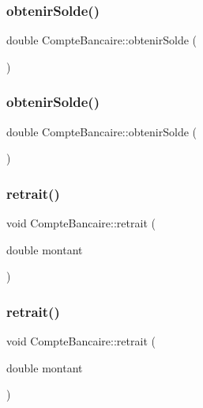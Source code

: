 \subsubsection{\texorpdfstring{obtenir\+Solde()}{obtenirSolde()}\hspace{0.1cm}{\footnotesize\ttfamily [1/2]}}
{\footnotesize\ttfamily double Compte\+Bancaire\+::obtenir\+Solde (\begin{DoxyParamCaption}{ }\end{DoxyParamCaption})}

\mbox{\label{classCompteBancaire_a6ed81e6f30e6d8d31f5c3ffe7f9755c4}} 
\subsubsection{\texorpdfstring{obtenir\+Solde()}{obtenirSolde()}\hspace{0.1cm}{\footnotesize\ttfamily [2/2]}}
{\footnotesize\ttfamily double Compte\+Bancaire\+::obtenir\+Solde (\begin{DoxyParamCaption}{ }\end{DoxyParamCaption})}

\mbox{\label{classCompteBancaire_ad25cfbad3651fd3a920b21a2d670826c}} 
\subsubsection{\texorpdfstring{retrait()}{retrait()}\hspace{0.1cm}{\footnotesize\ttfamily [1/2]}}
{\footnotesize\ttfamily void Compte\+Bancaire\+::retrait (\begin{DoxyParamCaption}\item[{double}]{montant }\end{DoxyParamCaption})}

\mbox{\label{classCompteBancaire_ad25cfbad3651fd3a920b21a2d670826c}} 
\subsubsection{\texorpdfstring{retrait()}{retrait()}\hspace{0.1cm}{\footnotesize\ttfamily [2/2]}}
{\footnotesize\ttfamily void Compte\+Bancaire\+::retrait (\begin{DoxyParamCaption}\item[{double}]{montant }\end{DoxyParamCaption})}



